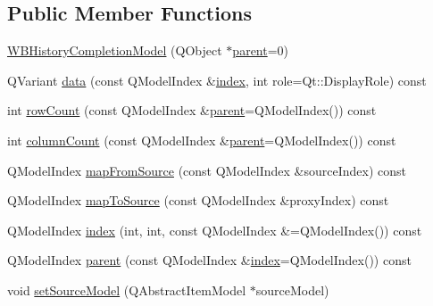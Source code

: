 \subsection*{Public Member Functions}
\begin{DoxyCompactItemize}
\item 
\hyperlink{class_w_b_history_completion_model_a835d8ee5c832113ef94805e31ae03e64}{W\-B\-History\-Completion\-Model} (Q\-Object $\ast$\hyperlink{class_w_b_history_completion_model_a4f06d5ece9d8aba9f470137b3d008e2b}{parent}=0)
\item 
Q\-Variant \hyperlink{class_w_b_history_completion_model_ace39028aadcfaf687fb8a12ff4e70095}{data} (const Q\-Model\-Index \&\hyperlink{class_w_b_history_completion_model_ac2da15e5c1fecc1312f58056224b5142}{index}, int role=Qt\-::\-Display\-Role) const 
\item 
int \hyperlink{class_w_b_history_completion_model_ac440de5607401eff7ec22c3f0cd41359}{row\-Count} (const Q\-Model\-Index \&\hyperlink{class_w_b_history_completion_model_a4f06d5ece9d8aba9f470137b3d008e2b}{parent}=Q\-Model\-Index()) const 
\item 
int \hyperlink{class_w_b_history_completion_model_ae527d2c74671dc95684acfbf75d601cb}{column\-Count} (const Q\-Model\-Index \&\hyperlink{class_w_b_history_completion_model_a4f06d5ece9d8aba9f470137b3d008e2b}{parent}=Q\-Model\-Index()) const 
\item 
Q\-Model\-Index \hyperlink{class_w_b_history_completion_model_aeefb211bbb28626fe7dbfbd39f09d0fa}{map\-From\-Source} (const Q\-Model\-Index \&source\-Index) const 
\item 
Q\-Model\-Index \hyperlink{class_w_b_history_completion_model_a2fb929fea59615528c02d723e1980bc8}{map\-To\-Source} (const Q\-Model\-Index \&proxy\-Index) const 
\item 
Q\-Model\-Index \hyperlink{class_w_b_history_completion_model_ac2da15e5c1fecc1312f58056224b5142}{index} (int, int, const Q\-Model\-Index \&=Q\-Model\-Index()) const 
\item 
Q\-Model\-Index \hyperlink{class_w_b_history_completion_model_a4f06d5ece9d8aba9f470137b3d008e2b}{parent} (const Q\-Model\-Index \&\hyperlink{class_w_b_history_completion_model_ac2da15e5c1fecc1312f58056224b5142}{index}=Q\-Model\-Index()) const 
\item 
void \hyperlink{class_w_b_history_completion_model_a7ea06700bceb5cb04a8a0e740c703eaa}{set\-Source\-Model} (Q\-Abstract\-Item\-Model $\ast$source\-Model)
\end{DoxyCompactItemize}


